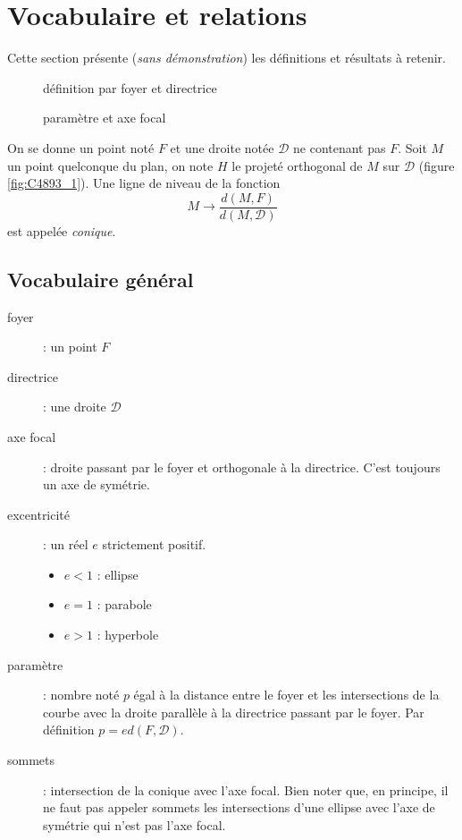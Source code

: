 

\section{Vocabulaire et relations}
Cette section présente (\emph{sans démonstration}) les définitions et résultats à retenir.
\begin{figure}[ht]
  \hfill
  \begin{minipage}{.5\linewidth}
    
    \caption{définition par foyer et directrice}
    \label{fig:C4893_1}
  \end{minipage}
  \hfill
  \begin{minipage}{.4\linewidth}
    
    \caption{paramètre et axe focal}
    \label{fig:C4893_2}
  \end{minipage}
  \hfill
\end{figure}

On se donne un point noté $F$ et une droite notée $\mathcal D$ ne contenant pas $F$. Soit $M$ un point quelconque du plan, on note $H$ le projeté orthogonal de $M$ sur $\mathcal D$ (figure \ref{fig:C4893_1}). Une ligne de niveau de la fonction
\begin{displaymath}
 M \rightarrow \dfrac{d(M,F)}{d(M,\mathcal D)}
\end{displaymath}
est appelée \emph{conique}.

\subsection{Vocabulaire général}
\begin{description}
 \item[foyer] : un point $F$
\item[directrice] : une droite $\mathcal D$
\item[axe focal] : droite passant par le foyer et orthogonale à la directrice. C'est toujours un axe de symétrie.
\item[excentricité] : un réel $e$ strictement positif.
  \begin{itemize}
 \item $e<1$ : ellipse
\item  $e=1$ : parabole
\item $e>1$ : hyperbole
\end{itemize}
\item[paramètre] :  nombre noté $p$ égal à la distance entre le foyer et les intersections de la courbe avec la droite parallèle à la directrice passant par le foyer. Par définition $p=e d(F,\mathcal D)$.
\item[sommets] : intersection de la conique avec l'axe focal. Bien noter que, en principe, il ne faut pas appeler sommets les intersections d'une ellipse avec l'axe de symétrie qui n'est pas l'axe focal.
\end{description}

